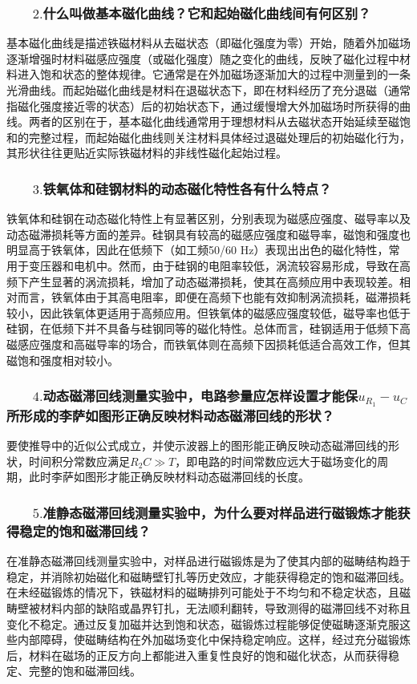 \documentclass[UTF-8,twoside,cs4size]{ctexart}
\begin{document}
\subsubsection*{$\qquad2.$什么叫做基本磁化曲线？它和起始磁化曲线间有何区别？}
基本磁化曲线是描述铁磁材料从去磁状态（即磁化强度为零）开始，随着外加磁场逐渐增强时材料磁感应强度（或磁化强度）随之变化的曲线，反映了磁化过程中材料进入饱和状态的整体规律。它通常是在外加磁场逐渐加大的过程中测量到的一条光滑曲线。而起始磁化曲线是材料在退磁状态下，即在材料经历了充分退磁（通常指磁化强度接近零的状态）后的初始状态下，通过缓慢增大外加磁场时所获得的曲线。两者的区别在于，基本磁化曲线通常用于理想材料从去磁状态开始延续至磁饱和的完整过程，而起始磁化曲线则关注材料具体经过退磁处理后的初始磁化行为，其形状往往更贴近实际铁磁材料的非线性磁化起始过程。
\subsubsection*{$\qquad3.$铁氧体和硅钢材料的动态磁化特性各有什么特点？}
铁氧体和硅钢在动态磁化特性上有显著区别，分别表现为磁感应强度、磁导率以及动态磁滞损耗等方面的差异。硅钢具有较高的磁感应强度和磁导率，磁饱和强度也明显高于铁氧体，因此在低频下（如工频50/60 Hz）表现出出色的磁化特性，常用于变压器和电机中。然而，由于硅钢的电阻率较低，涡流较容易形成，导致在高频下产生显著的涡流损耗，增加了动态磁滞损耗，使其在高频应用中表现较差。相对而言，铁氧体由于其高电阻率，即便在高频下也能有效抑制涡流损耗，磁滞损耗较小，因此铁氧体更适用于高频应用。但铁氧体的磁感应强度较低，磁导率也低于硅钢，在低频下并不具备与硅钢同等的磁化特性。总体而言，硅钢适用于低频下高磁感应强度和高磁导率的场合，而铁氧体则在高频下因损耗低适合高效工作，但其磁饱和强度相对较小。
\subsubsection*{$\qquad4.$动态磁滞回线测量实验中，电路参量应怎样设置才能保$u_{R_1}-u_C$所形成的李萨如图形正确反映材料动态磁滞回线的形状？}
要使推导中的近似公式成立，并使示波器上的图形能正确反映动态磁滞回线的形状，时间积分常数应满足$R_2 C\gg T$，即电路的时间常数应远大于磁场变化的周期，此时李萨如图形才能正确反映材料动态磁滞回线的长度。
\subsubsection*{$\qquad5.$准静态磁滞回线测量实验中，为什么要对样品进行磁锻炼才能获得稳定的饱和磁滞回线？}
在准静态磁滞回线测量实验中，对样品进行磁锻炼是为了使其内部的磁畴结构趋于稳定，并消除初始磁化和磁畴壁钉扎等历史效应，才能获得稳定的饱和磁滞回线。在未经磁锻炼的情况下，铁磁材料的磁畴排列可能处于不均匀和不稳定状态，且磁畴壁被材料内部的缺陷或晶界钉扎，无法顺利翻转，导致测得的磁滞回线不对称且变化不稳定。通过反复加磁并达到饱和状态，磁锻炼过程能够促使磁畴逐渐克服这些内部障碍，使磁畴结构在外加磁场变化中保持稳定响应。这样，经过充分磁锻炼后，材料在磁场的正反方向上都能进入重复性良好的饱和磁化状态，从而获得稳定、完整的饱和磁滞回线。
\end{document}
